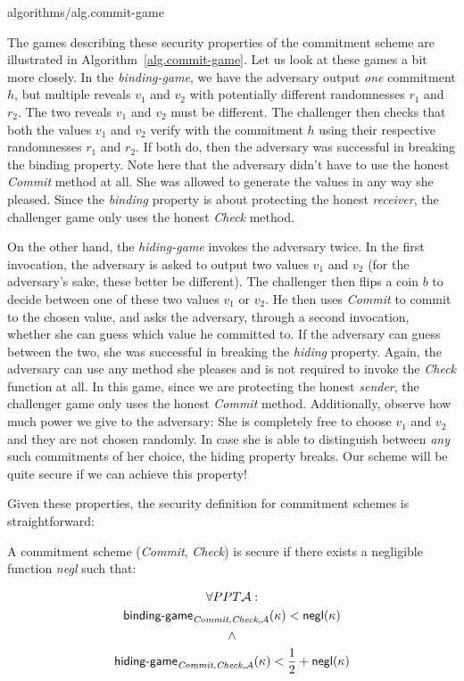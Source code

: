 {algorithms/alg.commit-game}

The games describing these security properties of the commitment scheme are
illustrated in Algorithm~\ref{alg.commit-game}. Let us look at these games a bit
more closely. In the \emph{binding-game}, we have the adversary output \emph{one}
commitment $h$, but multiple reveals $v_1$ and $v_2$ with potentially different
randomnesses $r_1$ and $r_2$. The two reveals $v_1$ and $v_2$ must be different.
The challenger then checks that both the values $v_1$ and $v_2$ verify with
the commitment $h$ using their respective randomnesses $r_1$ and $r_2$. If both
do, then the adversary was successful in breaking the binding property. Note here
that the adversary didn't have to use the honest \emph{Commit} method at all.
She was allowed to generate the values in any way she pleased. Since the \emph{binding}
property is about protecting the honest \emph{receiver}, the challenger game only uses
the honest \emph{Check} method.

On the other hand, the \emph{hiding-game} invokes the adversary twice. In the first
invocation, the adversary is asked to output two values $v_1$ and $v_2$ (for the
adversary's sake, these better be different). The challenger then flips a coin $b$
to decide between one of these two values $v_1$ or $v_2$. He then uses \emph{Commit}
to commit to the chosen value, and asks the adversary, through a second invocation,
whether she can guess which value he committed to. If the adversary can guess between
the two, she was successful in breaking the \emph{hiding} property. Again, the adversary
can use any method she pleases and is not required to invoke the \emph{Check} function
at all. In this game, since we are protecting the honest \emph{sender}, the challenger
game only uses the honest \emph{Commit} method. Additionally, observe how much power
we give to the adversary: She is completely free to choose $v_1$ and $v_2$ and they
are not chosen randomly. In case she is able to distinguish between \emph{any} such
commitments of her choice, the hiding property breaks. Our scheme will be quite
secure if we can achieve this property!

Given these properties, the security definition for commitment schemes is straightforward:

\begin{definition}
  A commitment scheme (\emph{Commit}, \emph{Check}) is secure if there exists a
  negligible function \emph{negl} such that:

  \begin{gather*}
    \forall PPT \mathcal{A}:\\
    \textsf{binding-game}_{\emph{Commit},\emph{Check},\mathcal{A}}(\kappa) < \textsf{negl}(\kappa)\\
    \land\\
    \textsf{hiding-game}_{\emph{Commit},\emph{Check},\mathcal{A}}(\kappa) < \frac{1}{2} + \textsf{negl}(\kappa)\\
  \end{gather*}
\end{definition}


